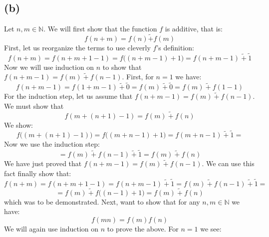 \documentclass{article}
\begin{document}
\subsection*{(b)}
Let \(n, m \in \mathbb{N}\). We will first show that the function \(f\) is additive, that is:
\begin{equation*}
    f(n + m) = f(n) \tilde{+} f(m)
\end{equation*}
First, let us reorganize the terms to use cleverly \(f\)'s definition:
\begin{equation*}
    f(n + m) = f(n + m + 1 - 1) = f\Big((n + m - 1) + 1\Big) = f(n + m - 1) \ \tilde{+} \ \tilde{1}
\end{equation*}
Now we will use induction on \(n\) to show that \(f(n + m - 1) = f(m) \ \tilde{+} \ f(n - 1)\). First, for \(n = 1\) we have:
\begin{equation*}
    f(n + m - 1) = f(1 + m - 1) \ \tilde{+} \ \tilde{0} = f(m) \ \tilde{+} \ \tilde{0} = f(m) \ \tilde{+} \ f(1 - 1)
\end{equation*}
For the induction step, let us assume that \(f(n + m - 1) = f(m) \ \tilde{+} \ f(n - 1)\). We must show that
\begin{equation*}
    f(m + (n + 1) - 1) = f(m) \ \tilde{+} \  f(n)
\end{equation*}
We show:
\begin{equation*}
    f\Big((m + (n + 1) - 1)\Big) = f\Big((m + n - 1) + 1\Big) = f(m + n - 1) \ \tilde{+} \ \tilde{1} = 
\end{equation*}
Now we use the induction step:
\begin{equation*}
    = f(m) \ \tilde{+} \ f(n - 1) \ \tilde{+} \ \tilde{1} = f(m) \ \tilde{+} \ f(n)
\end{equation*}
We have just proved that \(f(n + m - 1) = f(m) \ \tilde{+} \ f(n - 1)\). We can use this fact finally show that:
\begin{equation*}
    f(n + m) = f(n + m + 1 - 1) = f(n + m - 1) \ \tilde{+} \ \tilde{1} = f(m) \ \tilde{+} \ f(n - 1) \ \tilde{+} \ \tilde{1} =  
\end{equation*}
\begin{equation*}
    = f(m) \ \tilde{+} \ f\Big((n - 1) + 1\Big) = f(m) \ \tilde{+} \ f(n)
\end{equation*}
which was to be demonstrated.
Next, want to show that for any \(n, m \in \mathbb{N}\) we have:
\begin{equation*}
    f(mn) = f(m)f(n)
\end{equation*}
We will again use induction on \(n\) to prove the above. For \(n = 1\) we see:
\end{document}
